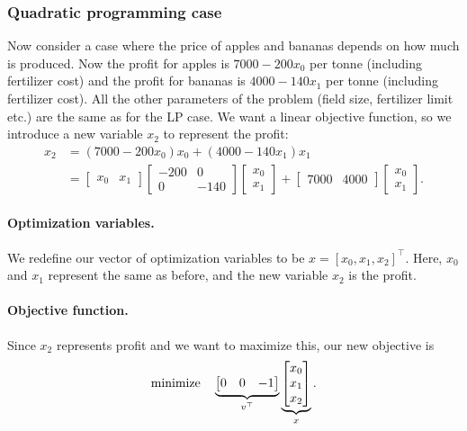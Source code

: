 \subsubsection{Quadratic programming case} \label{sec:farmingqp}
Now consider a case where the price of apples and bananas depends on how much is produced. Now the profit for apples is $7000-200x_0$ per tonne (including fertilizer cost) and the profit for bananas is $4000-140x_1$ per tonne (including fertilizer cost). All the other parameters of the problem (field size, fertilizer limit etc.) are the same as for the LP case. We want a linear objective function, so we introduce a new variable $x_2$ to represent the profit:
\begin{align*}
x_2 &= (7000-200x_0)x_0 + (4000-140x_1)x_1 \\
&= \begin{bmatrix} x_0 & x_1 \end{bmatrix} \begin{bmatrix} -200 & 0 \\ 0 & -140 \end{bmatrix} \begin{bmatrix} x_0 \\ x_1 \end{bmatrix} + \begin{bmatrix} 7000 & 4000 \end{bmatrix} \begin{bmatrix} x_0 \\ x_1 \end{bmatrix}.
\end{align*}

\paragraph{Optimization variables.}
We redefine our vector of optimization variables to be $x = [x_0, x_1, x_2]^\top$. Here, $x_0$ and $x_1$ represent the same as before, and the new variable $x_2$ is the profit.

\paragraph{Objective function.} Since $x_2$ represents profit and we want to maximize this, our new objective is
\[
\mathrm{minimize} \ \ \  \underbrace{\begin{bmatrix} 0 & 0 & -1 \end{bmatrix}}_{v^\top} \underbrace{\begin{bmatrix} x_0 \\ x_1 \\ x_2 \end{bmatrix}}_x.
\]

